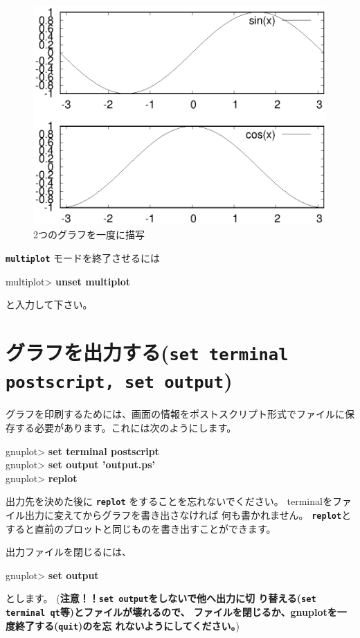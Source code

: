 \documentclass[a4j]{ujarticle} %
\newenvironment{terminal}{%
  \begin{center}
   \begin{minipage}{.8\textwidth}
    \setlength{\FrameSep}{.5\FrameSep}%
    \begin{framed}\ttfamily\small%
     \setlength\baselineskip{.85\baselineskip}%
}{%
    \end{framed}
   \end{minipage}
  \end{center}%
}
\begin{document}
\begin{figure}
\begin{center}
\begin{minipage}[hbtp]{0.49\textwidth}
\includegraphics[width=\hsize]{multi.eps}
\caption{2つのグラフを一度に描写}
\label{multi}
\end{minipage}
\end{center}
\end{figure}

{\bf\tt multiplot} モードを終了させるには
\begin{terminal}
multiplot> {\bf unset multiplot}
\end{terminal}
と入力して下さい。

\section{グラフを出力する({\tt\bf set terminal postscript, set output})}
グラフを印刷するためには、画面の情報をポストスクリプト形式でファイルに保存する必要があります。これには次のようにします。
\begin{terminal}
 gnuplot> {\bf set terminal postscript} \\
 gnuplot> {\bf set output 'output.ps'} \\
 gnuplot> {\bf replot}
\end{terminal}
出力先を決めた後に {\tt\bf replot} をすることを忘れないでください。
terminalをファイル出力に変えてからグラフを書き出さなければ
何も書かれません。
{\tt\bf replot}とすると直前のプロットと同じものを書き出すことができます。

出力ファイルを閉じるには、
\begin{terminal}
 gnuplot> {\bf set output}
\end{terminal}
とします。
(\textbf{注意！！{\tt\bf set output}をしないで他へ出力に切
り替える({\tt\bf set terminal qt}等)とファイルが壊れるので、
ファイルを閉じるか、gnuplotを一度終了する({\tt\bf quit})のを忘
れないようにしてください。})
\end{document}
